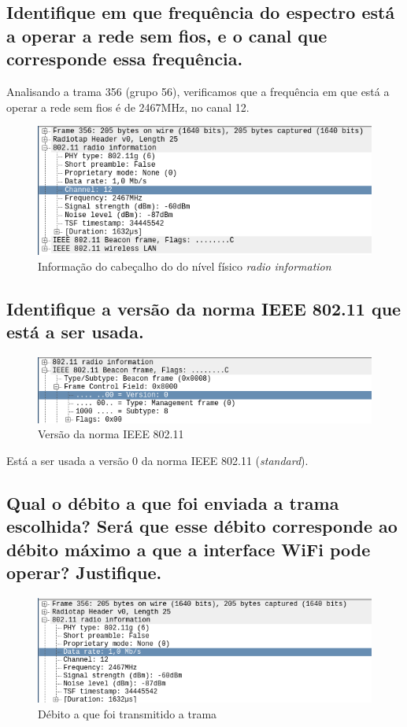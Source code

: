 \documentclass[a4paper]{article}
\begin{document}
 \subsection{Identifique em que frequência do espectro está a operar a rede sem fios, e o
canal que corresponde essa frequência.}
Analisando a trama 356 (grupo 56), verificamos que a frequência em que está a operar a rede sem fios é de 2467MHz, no canal 12.
\begin{figure}[H]
\centering
\includegraphics[scale=0.50]{pics/p1.png}
\caption{Informação do cabeçalho do do nível físico \textit{radio information}}
\end{figure}

 \subsection{Identifique a versão da norma IEEE 802.11 que está a ser usada.}
\begin{figure}[H]
\centering
\includegraphics[scale=0.60]{pics/p2.png}
\caption{Versão da norma IEEE 802.11}
\end{figure}
Está a ser usada a versão 0 da norma IEEE 802.11 (\textit{standard}).

 \subsection{Qual o débito a que foi enviada a trama escolhida? Será que esse débito
corresponde ao débito máximo a que a interface WiFi pode operar? Justifique.}
\begin{figure}[H]
\centering
\includegraphics[scale=0.50]{pics/p3-1.png}
\caption{Débito a que foi transmitido a trama}
\end{figure}
\end{document}
